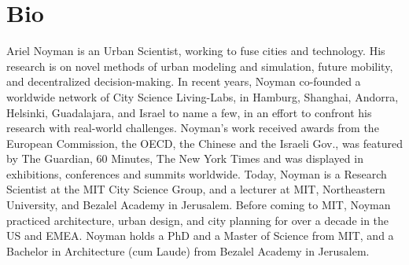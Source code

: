 \section*{Bio}

 {
  Ariel Noyman is an Urban Scientist, working to fuse cities and technology. His research is on novel methods of urban modeling and simulation, future mobility, and decentralized decision-making. In recent years, Noyman co-founded a worldwide network of City Science Living-Labs, in Hamburg, Shanghai, Andorra, Helsinki, Guadalajara, and Israel to name a few, in an effort to confront his research with real-world challenges.
  Noyman's work received awards from the European Commission, the OECD, the Chinese and the Israeli Gov., was featured by The Guardian, 60 Minutes, The New York Times and was displayed in exhibitions, conferences and summits worldwide. Today, Noyman is a Research Scientist at the MIT City Science Group, and a lecturer at MIT, Northeastern University, and Bezalel Academy in Jerusalem. Before coming to MIT, Noyman practiced architecture, urban design, and city planning for over a decade in the US and EMEA. Noyman holds a PhD and a Master of Science from MIT, and a Bachelor in Architecture (cum Laude) from Bezalel Academy in Jerusalem.
 }



